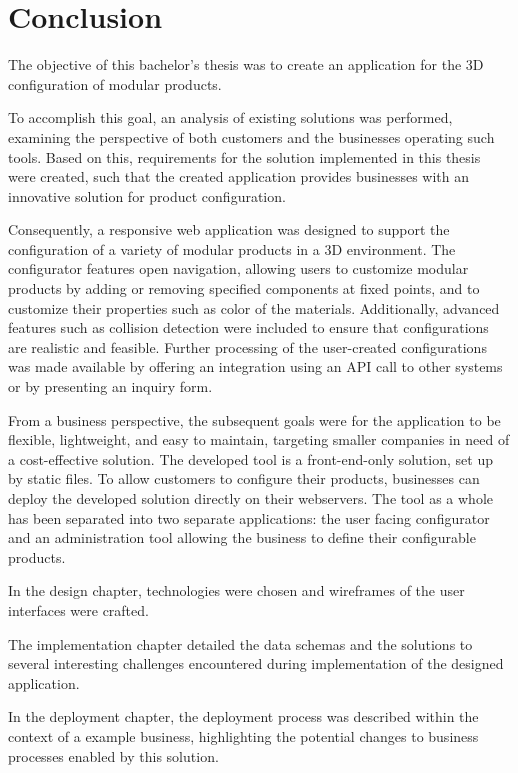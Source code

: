 \chapter{Conclusion}

The objective of this bachelor's thesis was to create an application for the 3D configuration of modular products.

To accomplish this goal, an analysis of existing solutions was performed, examining the perspective of both customers and the businesses operating such tools. Based on this, requirements for the solution implemented in this thesis were created, such that the created application provides businesses with an innovative solution for product configuration.

Consequently, a responsive web application was designed to support the configuration of a variety of modular products in a 3D environment. The configurator features open navigation, allowing users to customize modular products by adding or removing specified components at fixed points, and to customize their properties such as color of the materials. Additionally, advanced features such as collision detection were included to ensure that configurations are realistic and feasible. Further processing of the user-created configurations was made available by offering an integration using an API call to other systems or by presenting an inquiry form.

From a business perspective, the subsequent goals were for the  application to be flexible, lightweight, and easy to maintain, targeting smaller companies in need of a cost-effective solution. The developed tool is a front-end-only solution, set up by static files. To allow customers to configure their products, businesses can deploy the developed solution directly on their webservers. The tool as a whole has been separated into two separate applications: the user facing configurator and an administration tool allowing the business to define their configurable products.

In the design chapter, technologies were chosen and wireframes of the user interfaces were crafted.

The implementation chapter detailed the data schemas and the solutions to several interesting challenges encountered during implementation of the designed application.

In the deployment chapter, the deployment process was described within the context of a example business, highlighting the potential changes to business processes enabled by this solution.


